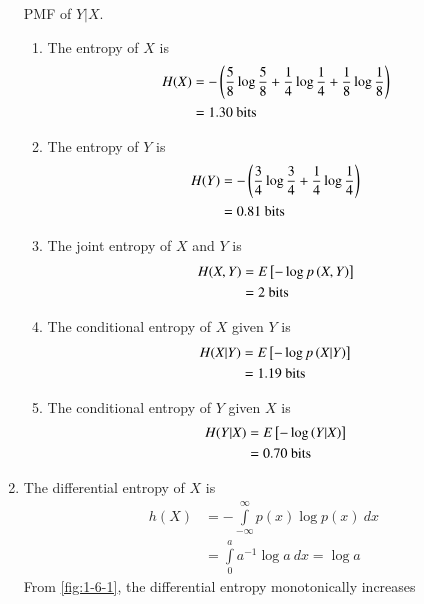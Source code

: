 \documentclass[journal,12pt,twocolumn]{IEEEtran}
\renewcommand\thesection{\arabic{section}}
\begin{document}
\begin{enumerate}[label=\thesection.\arabic*, ref=\thesection.\theenumi]
\begin{table}[!htb]
        \caption{PMF of $Y|X$.}
        \label{tab:1-5-4}
    \end{table}
    \begin{enumerate}[label=\theenumi.\arabic*, ref=\theenumi.\arabic*]
        \item The entropy of $X$ is 
        \begin{align}
            H(X) &= -\left(\frac{5}{8}\log\frac{5}{8} + \frac{1}{4}\log\frac{1}{4} + \frac{1}{8}\log\frac{1}{8}\right) \\
            &= 1.30\ \textrm{bits}
            \label{eq:1-5-1}
        \end{align}
        \item The entropy of $Y$ is 
        \begin{align}
            H(Y) &= -\left(\frac{3}{4}\log\frac{3}{4}+\frac{1}{4}\log\frac{1}{4}\right) \\
            &= 0.81\ \textrm{bits}
            \label{eq:1-5-2}
        \end{align}
        \item The joint entropy of $X$ and $Y$ is 
        \begin{align}
            H(X,Y) &= E{}\left[-\log p\left(X,Y\right)\right] \\
            &= 2\ \textrm{bits}
            \label{eq:1-5-3}
        \end{align}
        \item The conditional entropy of $X$ given $Y$ is 
        \begin{align}
            H(X|Y) &= E{}\left[-\log p\left(X|Y\right)\right] \\
            &= 1.19\ \textrm{bits}
            \label{eq:1-5-4}
        \end{align}
        \item The conditional entropy of $Y$ given $X$ is 
        \begin{align}
            H(Y|X) &= E{}\left[-\log\left(Y|X\right)\right] \\
            &= 0.70\ \textrm{bits}
            \label{eq:1-5-5}
        \end{align}
    \end{enumerate}
    \item The differential entropy of $X$ is 
    \begin{align}
        h(X) &= -\int\limits_{-\infty}^{\infty}p(x)\log p(x)\ dx \\
        &= \int\limits_0^aa^{-1}\log a\ dx = \log a
        \label{eq:1-6-1}
    \end{align}
    From \autoref{fig:1-6-1}, the differential entropy monotonically increases 

\end{enumerate}
\end{document}
